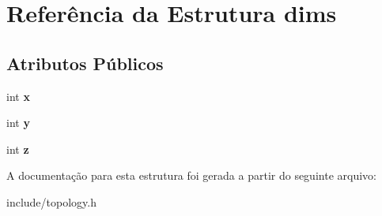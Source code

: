 \hypertarget{structdims}{
\section{Referência da Estrutura dims}
\label{structdims}
}
\subsection*{Atributos Públicos}
\begin{DoxyCompactItemize}
\item 
\hypertarget{structdims_addc4d70e6c364f5f016d56e033f6c7ca}{
int {\bfseries x}}
\label{structdims_addc4d70e6c364f5f016d56e033f6c7ca}

\item 
\hypertarget{structdims_a035c7d76793687dc267b6dfe02cea0c1}{
int {\bfseries y}}
\label{structdims_a035c7d76793687dc267b6dfe02cea0c1}

\item 
\hypertarget{structdims_a3f2edf0d5f22231f4d634e0ed8034be3}{
int {\bfseries z}}
\label{structdims_a3f2edf0d5f22231f4d634e0ed8034be3}

\end{DoxyCompactItemize}


A documentação para esta estrutura foi gerada a partir do seguinte arquivo:\begin{DoxyCompactItemize}
\item 
include/topology.h\end{DoxyCompactItemize}
